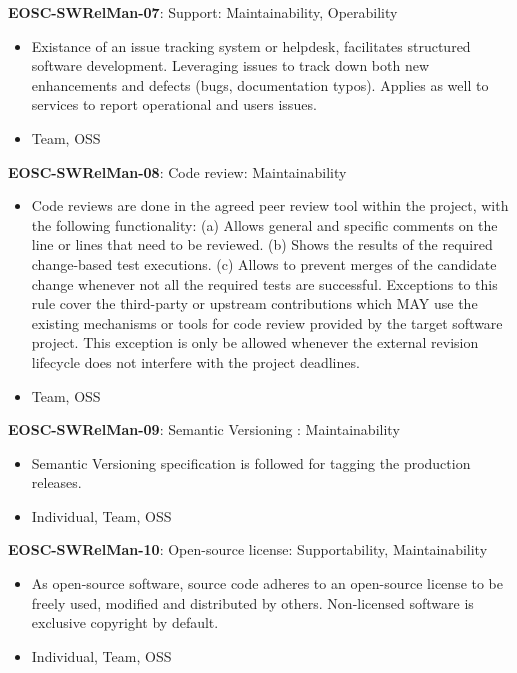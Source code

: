 \textbf{EOSC-SWRelMan-07}: Support: Maintainability, Operability

\begin{itemize}
    \item Existance of an issue tracking system or helpdesk, facilitates structured software development. Leveraging issues to track down both new enhancements and defects (bugs, documentation typos). Applies as well to services to report operational and users issues. \cite{srisopha_software_2018,shepherdson_cessda_2019,orviz_set_2017,orviz_fernandez_eosc-synergy_2020}
    \item Team, OSS
\end{itemize}

\textbf{EOSC-SWRelMan-08}: Code review: Maintainability

\begin{itemize}
    \item Code reviews are done in the agreed peer review tool within the project, with the following  functionality: (a) Allows general and specific comments on the line or lines that need to be reviewed. (b) Shows the results of the required change-based test executions. (c) Allows to prevent merges of the candidate change whenever not all the required tests are successful. Exceptions to this rule cover the third-party or upstream contributions which MAY use the existing mechanisms or tools for code review provided by the target software project. This exception is only be allowed whenever the external revision lifecycle does not interfere with the project deadlines. \cite{srisopha_software_2018,aberdour_achieving_2007,zuser_software_2005,orviz_set_2017}
    \item Team, OSS
\end{itemize}

\textbf{EOSC-SWRelMan-09}: Semantic Versioning : Maintainability

\begin{itemize}
    \item Semantic Versioning specification is followed for tagging the production releases. \cite{orviz_set_2017,raymond_software_2013}
    \item Individual, Team, OSS
\end{itemize}

\textbf{EOSC-SWRelMan-10}: Open-source license: Supportability, Maintainability

\begin{itemize}
    \item As open-source software, source code adheres to an open-source license to be freely used, modified and distributed by others. Non-licensed software is exclusive copyright by default. \cite{orviz_set_2017,raymond_software_2013}
    \item Individual, Team, OSS
\end{itemize}

